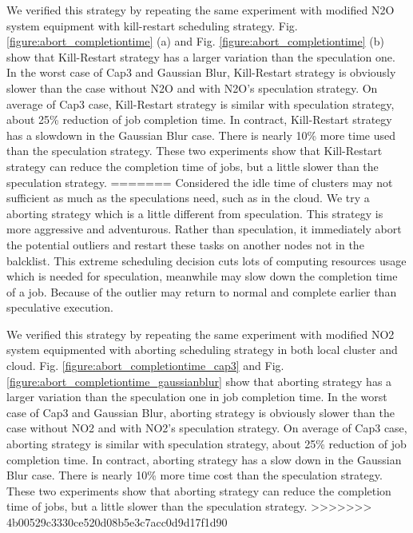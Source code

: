 We verified this strategy by repeating the same experiment with modified N2O system equipment with kill-restart scheduling strategy. Fig. \ref{figure:abort_completiontime} (a) and Fig. \ref{figure:abort_completiontime} (b) show that Kill-Restart strategy has a larger variation than the speculation one. In the worst case of Cap3 and Gaussian Blur, Kill-Restart strategy is obviously slower than the case without N2O and with N2O's speculation strategy. On average of Cap3 case, Kill-Restart strategy is similar with speculation strategy, about 25\% reduction of job completion time. In contract, Kill-Restart strategy has a slowdown in the Gaussian Blur case. There is nearly 10\% more time used than the speculation strategy. These two experiments show that Kill-Restart strategy can reduce the completion time of jobs, but a little slower than the speculation strategy.
=======
Considered the idle time of clusters may not sufficient as much as the speculations need, such as in the cloud. We try a aborting strategy which is a little different from speculation. This strategy is more aggressive and adventurous. Rather than speculation, it immediately abort the potential outliers and restart these tasks on another nodes not in the balcklist. This extreme scheduling decision cuts lots of computing resources usage which is needed for speculation, meanwhile may slow down the completion time of a job. Because of the outlier may return to normal and complete earlier than speculative execution.

We verified this strategy by repeating the same experiment with modified NO2 system equipmented with aborting scheduling strategy in both local cluster and cloud. Fig. \ref{figure:abort_completiontime_cap3} and Fig. \ref{figure:abort_completiontime_gaussianblur} show that aborting strategy has a larger variation than the speculation one in job completion time. In the worst case of Cap3 and Gaussian Blur, aborting strategy is obviously slower than the case without NO2 and with NO2's speculation strategy. On average of Cap3 case, aborting strategy is similar with speculation strategy, about 25\% reduction of job completion time. In contract, aborting strategy has a slow down in the Gaussian Blur case. There is nearly 10\% more time cost than the speculation strategy. These two experiments show that aborting strategy can reduce the completion time of jobs, but a little slower than the speculation strategy.
>>>>>>> 4b00529c3330ce520d08b5e3c7acc0d9d17f1d90

